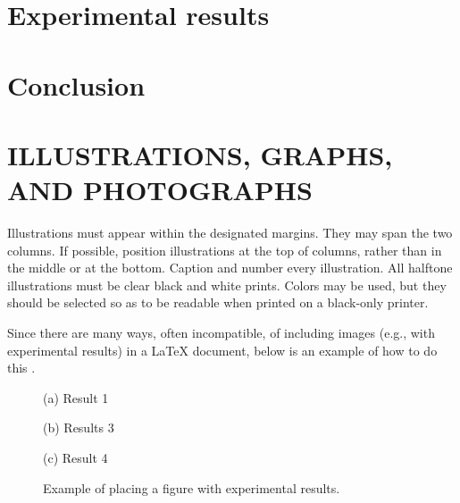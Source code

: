 \documentclass{article}
\begin{document}
\section{Experimental results}

\section{Conclusion}


\section{ILLUSTRATIONS, GRAPHS, AND PHOTOGRAPHS}
\label{sec:illust}

Illustrations must appear within the designated margins.  They may span the two
columns.  If possible, position illustrations at the top of columns, rather
than in the middle or at the bottom.  Caption and number every illustration.
All halftone illustrations must be clear black and white prints.  Colors may be
used, but they should be selected so as to be readable when printed on a
black-only printer.

Since there are many ways, often incompatible, of including images (e.g., with
experimental results) in a LaTeX document, below is an example of how to do
this \cite{Lamp86}.

\begin{figure}[htb]

\begin{minipage}[b]{1.0\linewidth}
  \centering
  \vspace{2.0cm}
  \centerline{(a) Result 1}\medskip
\end{minipage}
%
\begin{minipage}[b]{.48\linewidth}
  \centering
  \vspace{1.5cm}
  \centerline{(b) Results 3}\medskip
\end{minipage}
\hfill
\begin{minipage}[b]{0.48\linewidth}
  \centering
  \vspace{1.5cm}
  \centerline{(c) Result 4}\medskip
\end{minipage}
%
\caption{Example of placing a figure with experimental results.}
\label{fig:res}
%
\end{figure}
\end{document}
